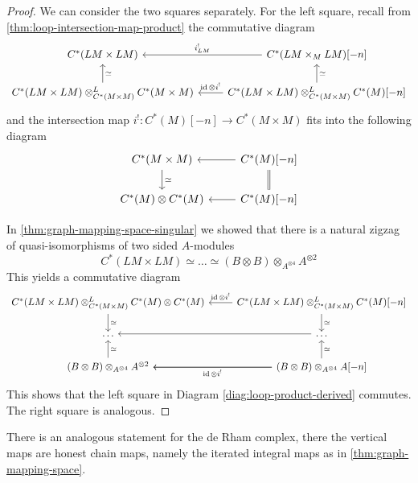 \documentclass{scrartcl}
\theoremstyle{plain}
\theoremstyle{definition}
\newcommand{\quiso}{\simeq}
\DeclareMathOperator{\id}{id}
\begin{document}
\begin{proof}
    We can consider the two squares separately. For the left square, recall from \cref{thm:loop-intersection-map-product} the commutative diagram 
    \begin{equation}
        \begin{tikzcd}
            C^*(LM\times LM) & \ar[l, swap, "i^!_{LM}"] C^{*}(LM\times_M LM)[-n]  \\
            \uar[swap, "\quiso"] C^*(LM\times LM) \otimes^L_{C^*(M\times M)} C^*(M\times M) & \uar[swap, "\quiso"]\lar[swap, "\id\otimes i^!"] C^*(LM\times LM) \otimes^L_{C^*(M\times M)} C^*(M)[-n]
        \end{tikzcd}
    \end{equation}
    and the intersection map $i^!\colon C^*(M)[-n]\to C^*(M\times M)$ fits into the following diagram 
    \begin{equation}
        \begin{tikzcd}
            C^*(M\times M) \dar["\quiso"] & \lar C^*(M)[-n]\dar[equal]\\
            C^*(M)\otimes C^*(M) & \lar C^*(M)[-n]
        \end{tikzcd}
    \end{equation}

    In \cref{thm:graph-mapping-space-singular} we showed that there is a natural zigzag of quasi-isomorphisms of two sided $A$-modules $$C^*(LM\times LM)\quiso\dots\quiso (B\otimes B)\otimes_{A^{\otimes 4}} A^{\otimes 2}$$
    This yields a commutative diagram
    \begin{equation}
        \begin{tikzcd}
            \dar["\quiso"] C^*(LM\times LM) \otimes^L_{C^*(M\times M)} C^*(M)\otimes C^*(M) & \dar["\quiso"]\lar[swap, "\id\otimes i^!"] C^*(LM\times LM) \otimes^L_{C^*(M\times M)} C^*(M)[-n] \\
            \dots & \lar \dots \\
            (B\otimes B)\otimes_{A^{\otimes 4}} A^{\otimes 2} \uar[swap, "\quiso"] & \lar["\id\otimes i^!"] \lar (B\otimes B)\otimes_{A^{\otimes 4}} A[-n] \uar[swap, "\quiso"]
        \end{tikzcd}
    \end{equation}
    This shows that the left square in Diagram \ref{diag:loop-product-derived} commutes. The right square is analogous. 
\end{proof}
There is an analogous statement for the de Rham complex, there the vertical maps are honest chain maps, namely the iterated integral maps as in \cref{thm:graph-mapping-space}. 
\end{document}
